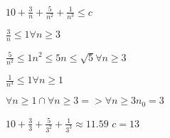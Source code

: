 \vspace{0.15cm}
\hspace{8.25cm}\( 10 + \frac{3}{n} + \frac{5}{n^2} + \frac{1}{n^3} \leq c\) 

\vspace{0.15cm}
\hspace{8.25cm}\(\frac{3}{n} \leq 1\)\quad \(\forall n \geq 3\)  

\vspace{0.15cm}
\hspace{7.75cm}\(\frac{5}{n^2} \leq 1\)\quad \(n^2 \leq 5\)\quad \(n \leq \sqrt{5}\)\quad \(\forall n \geq 3\)

\vspace{0.15cm}
\hspace{7.75cm}\(\frac{1}{n^3} \leq 1\)\quad \(\forall n \geq 1\) 

\vspace{0.15cm}
\hspace{8cm}\(\forall n \geq 1 \cap \forall n \geq 3\)\quad\(=>\)\quad\(\forall n \geq 3\)\quad \(\boxed{n_0 = 3}\)

\vspace{0.15cm}
\hspace{8.25cm}\(10 + \frac{3}{3} + \frac{5}{3^2} + \frac{1}{3^3} \approx 11.59\)\hspace{0.5cm} \(\boxed{c = 13}\)



